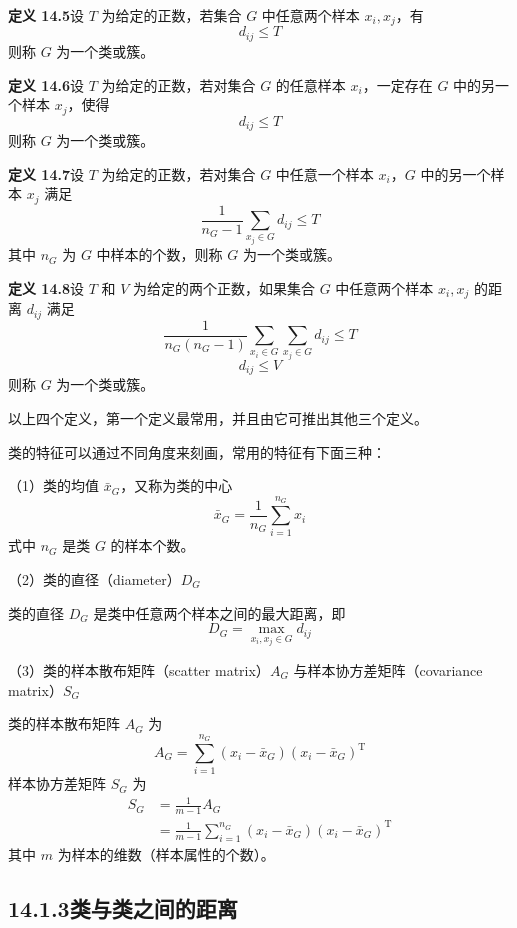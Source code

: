 \documentclass[UTF8, 12pt, fontset=fandol, oneside]{ctexart}
\begin{document}
\noindent\textbf{定义 14.5}\quad 设 $T$ 为给定的正数，若集合 $G$ 中任意两个样本 $x_i,x_j$，有
\[
d_{ij}\leqslant T
\]
则称 $G$ 为一个类或簇。

\noindent\textbf{定义 14.6}\quad 设 $T$ 为给定的正数，若对集合 $G$ 的任意样本 $x_i$，一定存在 $G$ 中的另一个样本 $x_j$，使得
\[
d_{ij}\leqslant T
\]
则称 $G$ 为一个类或簇。

\noindent\textbf{定义 14.7}\quad 设 $T$ 为给定的正数，若对集合 $G$ 中任意一个样本 $x_i$，$G$ 中的另一个样本 $x_j$ 满足
\[
\frac{1}{n_G-1}\sum_{x_j\in G} d_{ij}\leqslant T
\]
其中 $n_G$ 为 $G$ 中样本的个数，则称 $G$ 为一个类或簇。

\noindent\textbf{定义 14.8}\quad 设 $T$ 和 $V$ 为给定的两个正数，如果集合 $G$ 中任意两个样本 $x_i,x_j$ 的距离 $d_{ij}$ 满足
\[
\frac{1}{n_G(n_G-1)}\sum_{x_i\in G}\sum_{x_j\in G} d_{ij}\leqslant T
\]
\[
d_{ij}\leqslant V
\]
则称 $G$ 为一个类或簇。

以上四个定义，第一个定义最常用，并且由它可推出其他三个定义。

类的特征可以通过不同角度来刻画，常用的特征有下面三种：

（1）类的均值 $\bar x_G$，又称为类的中心
\begin{equation}
\bar x_G=\frac{1}{n_G}\sum_{i=1}^{n_G}x_i
\tag{14.10}
\end{equation}
式中 $n_G$ 是类 $G$ 的样本个数。

（2）类的直径（diameter）$D_G$

类的直径 $D_G$ 是类中任意两个样本之间的最大距离，即
\begin{equation}
D_G=\max_{x_i,x_j\in G} d_{ij}
\tag{14.11}
\end{equation}

（3）类的样本散布矩阵（scatter matrix）$A_G$ 与样本协方差矩阵（covariance matrix）$S_G$

类的样本散布矩阵 $A_G$ 为
\begin{equation}
A_G=\sum_{i=1}^{n_G}(x_i-\bar x_G)(x_i-\bar x_G)^{\mathrm{T}}
\tag{14.12}
\end{equation}
样本协方差矩阵 $S_G$ 为
\begin{equation}
\begin{aligned}
S_G&=\frac{1}{m-1}A_G\\
&=\frac{1}{m-1}\sum_{i=1}^{n_G}(x_i-\bar x_G)(x_i-\bar x_G)^{\mathrm{T}}
\end{aligned}
\tag{14.13}
\end{equation}
其中 $m$ 为样本的维数（样本属性的个数）。

\subsection*{14.1.3\quad 类与类之间的距离}
\end{document}

